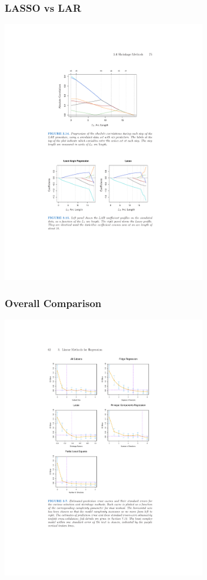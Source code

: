 \begin{frame}
\frametitle{LASSO vs LAR}
\begin{center}
\includegraphics[width=3.5in]{./resources/lar-lasso}
\end{center}
\end{frame}

\begin{frame}
\frametitle{Overall Comparison}
\begin{center}
\includegraphics[width=3.5in]{./resources/comparisons}
\end{center}
\end{frame}


